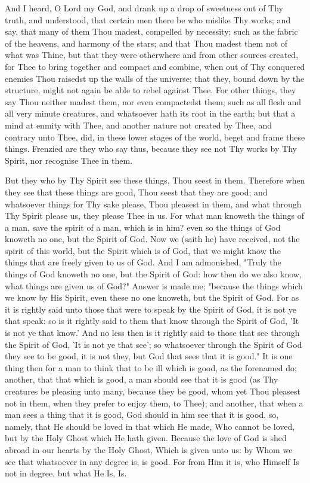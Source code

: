 \documentclass[b5paper,openright,12pt,twoside]{book}
\begin{document}
And I heard, O Lord my God, and drank up a drop of sweetness out of Thy
truth, and understood, that certain men there be who mislike Thy works;
and say, that many of them Thou madest, compelled by necessity; such
as the fabric of the heavens, and harmony of the stars; and that Thou
madest them not of what was Thine, but that they were otherwhere and
from other sources created, for Thee to bring together and compact and
combine, when out of Thy conquered enemies Thou raisedst up the walls of
the universe; that they, bound down by the structure, might not again
be able to rebel against Thee. For other things, they say Thou neither
madest them, nor even compactedst them, such as all flesh and all very
minute creatures, and whatsoever hath its root in the earth; but that
a mind at enmity with Thee, and another nature not created by Thee, and
contrary unto Thee, did, in these lower stages of the world, beget and
frame these things. Frenzied are they who say thus, because they see not
Thy works by Thy Spirit, nor recognise Thee in them.

But they who by Thy Spirit see these things, Thou seest in them.
Therefore when they see that these things are good, Thou seest that they
are good; and whatsoever things for Thy sake please, Thou pleasest in
them, and what through Thy Spirit please us, they please Thee in us. For
what man knoweth the things of a man, save the spirit of a man, which is
in him? even so the things of God knoweth no one, but the Spirit of God.
Now we (saith he) have received, not the spirit of this world, but the
Spirit which is of God, that we might know the things that are freely
given to us of God. And I am admonished, "Truly the things of God
knoweth no one, but the Spirit of God: how then do we also know, what
things are given us of God?" Answer is made me; "because the things
which we know by His Spirit, even these no one knoweth, but the Spirit
of God. For as it is rightly said unto those that were to speak by the
Spirit of God, it is not ye that speak: so is it rightly said to them
that know through the Spirit of God, 'It is not ye that know.' And no
less then is it rightly said to those that see through the Spirit of
God, 'It is not ye that see'; so whatsoever through the Spirit of God
they see to be good, it is not they, but God that sees that it is good."
It is one thing then for a man to think that to be ill which is good,
as the forenamed do; another, that that which is good, a man should see
that it is good (as Thy creatures be pleasing unto many, because they
be good, whom yet Thou pleasest not in them, when they prefer to enjoy
them, to Thee); and another, that when a man sees a thing that it is
good, God should in him see that it is good, so, namely, that He should
be loved in that which He made, Who cannot be loved, but by the Holy
Ghost which He hath given. Because the love of God is shed abroad in our
hearts by the Holy Ghost, Which is given unto us: by Whom we see that
whatsoever in any degree is, is good. For from Him it is, who Himself Is
not in degree, but what He Is, Is.
\end{document}

